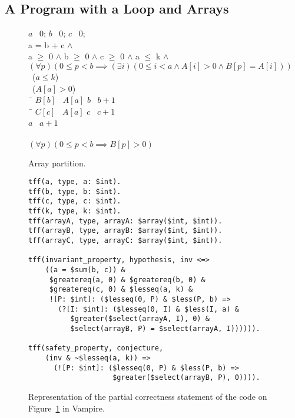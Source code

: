 \subsection{A Program with a Loop and Arrays}

\begin{figure*}[bt]
{
  \begin{center}
    \parbox{0cm}{
  \begin{tabbing}
    $a$ \ass\ $0$; $b$ \ass\ $0$; $c$ \ass\ $0$; \\[.5em]
     a = b + c $\wedge$ \\
    {\color{white}} a $\geq$ 0 $\wedge$ b $\geq$ 0 $\wedge$ c $\geq$
    0 $\wedge$ a $\leq$ k $\wedge$ \\
    {\color{white}} $(\forall p) (0\leq p<b \implies
    (\exists i) (0 \leq i < a \wedge A[i] > 0 \wedge B[p] = A[i]))$\\[1em]
    \WHILE\ ($a \leq k$) \DO \\ \inc
      \IF\ ($A[a] > 0$) \\ \inc
        \THEN\ \=\+ $B[b]$ \ass\ $A[a]$\semicol\; $b$ \ass\ $b+1$\semicol \\ \dec
        \ELSE\ \=\+ $C[c]$ \ass\ $A[a]$\semicol\; $c$ \ass\ $c+1$\semicol \\ \dec \dec
      $a$ \ass\ $a+1$\semicol \\ \dec
    \OD\\[.5em]
     $(\forall p)(0 \leq p<b \implies B[p]> 0)$
  \end{tabbing}
    }
  \end{center}
  \caption{Array partition.\label{fig:partition}}
}
\end{figure*}

\begin{figure*}[tb]
\begin{lstlisting}[language=tptp]
tff(a, type, a: $int).
tff(b, type, b: $int).
tff(c, type, c: $int).
tff(k, type, k: $int).
tff(arrayA, type, arrayA: $array($int, $int)).
tff(arrayB, type, arrayB: $array($int, $int)).
tff(arrayC, type, arrayC: $array($int, $int)).

tff(invariant_property, hypothesis, inv <=>
    ((a = $sum(b, c)) &
     $greatereq(a, 0) & $greatereq(b, 0) &
     $greatereq(c, 0) & $lesseq(a, k) &
     ![P: $int]: ($lesseq(0, P) & $less(P, b) =>
       (?[I: $int]: ($lesseq(0, I) & $less(I, a) &
          $greater($select(arrayA, I), 0) &
          $select(arrayB, P) = $select(arrayA, I)))))).

tff(safety_property, conjecture,
    (inv & ~$lesseq(a, k)) =>
      (![P: $int]: ($lesseq(0, P) & $less(P, b) =>
                    $greater($select(arrayB, P), 0)))).
\end{lstlisting}
\caption{Representation of the partial correctness statement of the code on Figure~\ref{fig:partition} in Vampire\label{fig:loop_safety_Vampire}.}
\end{figure*}

